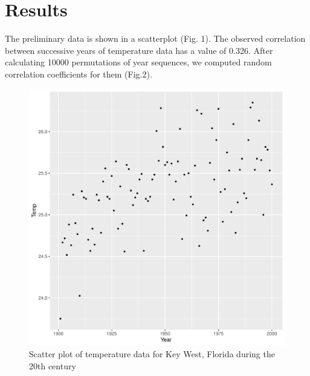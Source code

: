 \documentclass[12pt]{article}
\begin{document}
  \section{Results}
  The preliminary data is shown in a scatterplot (Fig. 1). The observed correlation between successive years of temperature data has a value of 0.326. After calculating 10000 permutations of year sequences, we computed random correlation coefficients for them (Fig.2).
  \begin{figure}[h]
  \caption{Scatter plot of temperature data for Key West, Florida during the 20th century}
  \centering
  \includegraphics[scale=0.7]{ast_plot}
  \end{figure}
\end{document}
